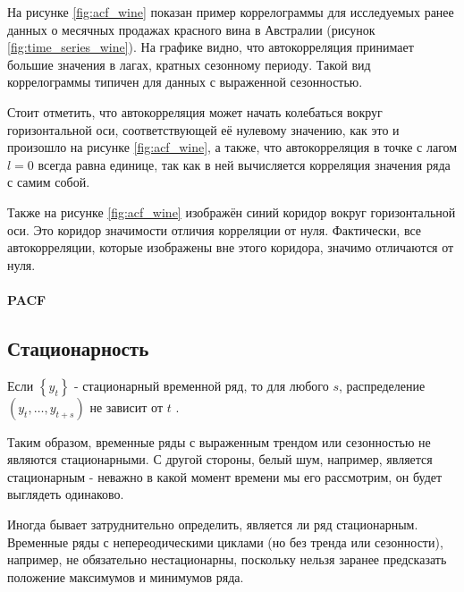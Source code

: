 На рисунке \ref{fig:acf_wine} показан пример коррелограммы для исследуемых 
ранее данных о месячных продажах красного вина в Австралии 
(рисунок \ref{fig:time_series_wine}). На графике видно, что автокорреляция принимает 
большие значения в лагах, кратных сезонному периоду. Такой вид коррелограммы 
типичен для данных с выраженной сезонностью.

Стоит отметить, что автокорреляция может начать колебаться вокруг горизонтальной оси, 
соответствующей её нулевому значению, как это и произошло на рисунке \ref{fig:acf_wine}, 
а также, что автокорреляция в точке с лагом $l = 0$ всегда равна единице, 
так как в ней вычисляется корреляция значения ряда с самим собой.

Также на рисунке \ref{fig:acf_wine} изображён синий коридор вокруг горизонтальной оси. 
Это коридор значимости отличия корреляции от нуля. Фактически, все автокорреляции, 
которые изображены вне этого коридора, значимо отличаются от нуля.

\paragraph{\color{red}PACF}

\subsection{Стационарность}

Если $\left\{y_t\right\}$ - стационарный временной ряд, то 
для любого $s$, распределение $(y_t, \dots, y_{t+s})$ не зависит 
от $t$ \cite{Forecasting_Hyndman}. 

Таким образом, временные ряды с выраженным трендом или сезонностью не являются стационарными.
С другой стороны, белый шум, например, является стационарным - неважно в какой момент времени 
мы его рассмотрим, он будет выглядеть одинаково.

Иногда бывает затруднительно определить, является ли ряд стационарным. Временные ряды с 
непереодическими циклами (но без тренда или сезонности), например, не обязательно нестационарны, поскольку 
нельзя заранее предсказать положение максимумов и минимумов ряда.

